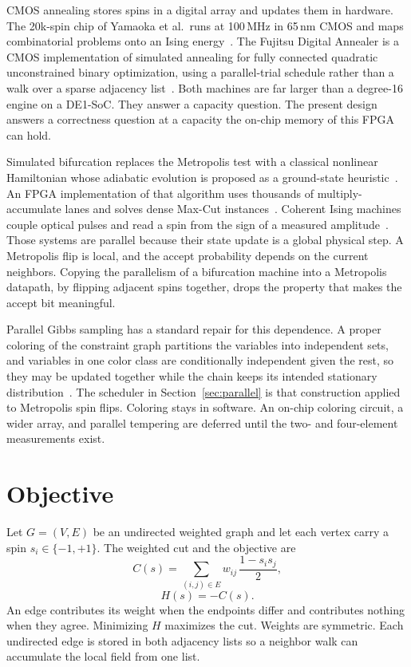 \documentclass[10pt,twocolumn]{article}
\begin{document}
CMOS annealing stores spins in a digital array and updates them in hardware.
The 20k-spin chip of Yamaoka et al.\ runs at 100\,MHz in 65\,nm CMOS and maps combinatorial problems onto an Ising energy~\citep{yamaoka2016}.
The Fujitsu Digital Annealer is a CMOS implementation of simulated annealing for fully connected quadratic unconstrained binary optimization, using a parallel-trial schedule rather than a walk over a sparse adjacency list~\citep{aramon2019}.
Both machines are far larger than a degree-16 engine on a DE1-SoC.
They answer a capacity question.
The present design answers a correctness question at a capacity the on-chip memory of this FPGA can hold.

Simulated bifurcation replaces the Metropolis test with a classical nonlinear Hamiltonian whose adiabatic evolution is proposed as a ground-state heuristic~\citep{goto2019}.
An FPGA implementation of that algorithm uses thousands of multiply-accumulate lanes and solves dense Max-Cut instances~\citep{tatsumura2019}.
Coherent Ising machines couple optical pulses and read a spin from the sign of a measured amplitude~\citep{inagaki2016}.
Those systems are parallel because their state update is a global physical step.
A Metropolis flip is local, and the accept probability depends on the current neighbors.
Copying the parallelism of a bifurcation machine into a Metropolis datapath, by flipping adjacent spins together, drops the property that makes the accept bit meaningful.

Parallel Gibbs sampling has a standard repair for this dependence.
A proper coloring of the constraint graph partitions the variables into independent sets, and variables in one color class are conditionally independent given the rest, so they may be updated together while the chain keeps its intended stationary distribution~\citep{gonzalez2011}.
The scheduler in Section~\ref{sec:parallel} is that construction applied to Metropolis spin flips.
Coloring stays in software.
An on-chip coloring circuit, a wider array, and parallel tempering are deferred until the two- and four-element measurements exist.

\section{Objective}
\label{sec:objective}

Let \(G=(V,E)\) be an undirected weighted graph and let each vertex carry a spin \(s_i\in\{-1,+1\}\).
The weighted cut and the objective are
\begin{equation}
C(s)=\sum_{(i,j)\in E} w_{ij}\,\frac{1-s_i s_j}{2},
\label{eq:cut}
\end{equation}
\begin{equation}
H(s)=-C(s).
\label{eq:energy}
\end{equation}
An edge contributes its weight when the endpoints differ and contributes nothing when they agree.
Minimizing \(H\) maximizes the cut.
Weights are symmetric.
Each undirected edge is stored in both adjacency lists so a neighbor walk can accumulate the local field from one list.
\end{document}
